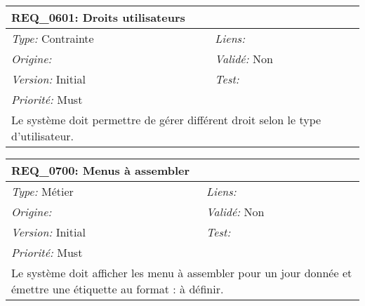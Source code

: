\begin{table}[!h]

\begin{tabular}{|p{60mm}p{100mm}|}

\hline

\multicolumn{2}{|l|}{\textbf{REQ\_0601:} Droits utilisateurs} \\ \hline

\emph{Type:} Contrainte & \emph{Liens:}  \\

\emph{Origine:}  & \emph{Validé:} Non \\

\emph{Version:} Initial & \emph{Test:}  \\

\emph{Priorité:} Must & \\ \hline

\multicolumn{2}{|p{16cm}|}{Le système doit permettre de gérer différent droit selon le type d'utilisateur.} \\ \hline

\end{tabular}

\end{table}



\begin{table}[!h]

\begin{tabular}{|p{60mm}p{100mm}|}

\hline

\multicolumn{2}{|l|}{\textbf{REQ\_0700:} Menus à assembler} \\ \hline

\emph{Type:} Métier & \emph{Liens:}  \\

\emph{Origine:}  & \emph{Validé:} Non \\

\emph{Version:} Initial & \emph{Test:}  \\

\emph{Priorité:} Must & \\ \hline

\multicolumn{2}{|p{16cm}|}{Le système doit afficher les menu à assembler pour un jour donnée et émettre une étiquette au format : à définir.} \\ \hline

\end{tabular}

\end{table}



